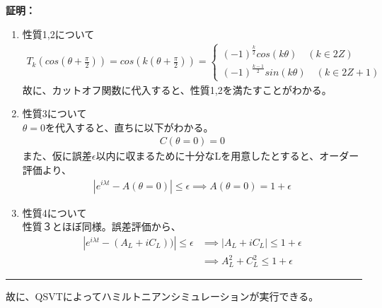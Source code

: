 \documentclass[a4paper,10.5pt]{article}
\numberwithin{equation}{section}
\newenvironment{proofbox}
{\begin{prooflabel}\textbf{証明：}\end{prooflabel}\vspace{0.8em}}
{\par\vspace{1em}\hrule\vspace{1em}}
\begin{document}
\begin{proofbox}
    \begin{enumerate}
        \item 性質1,2について
        \begin{align*}
            T_{k}(cos(\theta+\frac{\pi}{2}))=cos(k(\theta+\frac{\pi}{2}))=\begin{cases}
                (-1)^{\frac{k}{2}}cos(k\theta)\quad (k\in 2Z)\\
                (-1)^{\frac{k-1}{2}}sin(k\theta) \quad (k\in 2Z+1)
            \end{cases}
        \end{align*}
        故に、カットオフ関数に代入すると、性質1,2を満たすことがわかる。
        \item 性質3について\\
        $\theta=0$を代入すると、直ちに以下がわかる。
        \begin{align*}
            C(\theta=0)=0
        \end{align*}
        また、仮に誤差$\epsilon$以内に収まるために十分なLを用意したとすると、オーダー評価より、
        \begin{align*}
            |e^{i\lambda t}-A(\theta=0)|\leq \epsilon \implies A(\theta=0)=1+\epsilon
        \end{align*}
        \item 性質4について\\
        性質３とほぼ同様。誤差評価から、
        \begin{align*}
            |e^{i\lambda t}-(A_{L}+iC_{L}))|\leq \epsilon &\implies |A_{L}+iC_{L}|\leq 1+\epsilon\\
            &\implies A^{2}_{L}+C^{2}_{L} \leq 1+\epsilon
            \end{align*}
    \end{enumerate}
\end{proofbox}
故に、QSVTによってハミルトニアンシミュレーションが実行できる。
\end{document}
